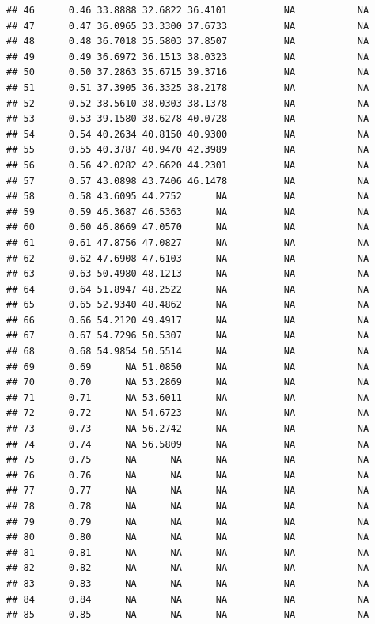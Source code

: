 \documentclass{article}\usepackage[]{graphicx}\usepackage[]{color}
\makeatletter
\newenvironment{kframe}{%
 \def\at@end@of@kframe{}%
 \ifinner\ifhmode%
  \def\at@end@of@kframe{\end{minipage}}%
  \begin{minipage}{\columnwidth}%
 \fi\fi%
 \def\FrameCommand##1{\hskip\@totalleftmargin \hskip-\fboxsep
 \colorbox{shadecolor}{##1}\hskip-\fboxsep
     \hskip-\linewidth \hskip-\@totalleftmargin \hskip\columnwidth}%
 \MakeFramed {\advance\hsize-\width
   \@totalleftmargin\z@ \linewidth\hsize
   \@setminipage}}%
 {\par\unskip\endMakeFramed%
 \at@end@of@kframe}
\newenvironment{knitrout}{}{} %
\makeatother
\begin{document}
\begin{knitrout}
\begin{kframe}
\begin{verbatim}
## 46      0.46 33.8888 32.6822 36.4101          NA           NA
## 47      0.47 36.0965 33.3300 37.6733          NA           NA
## 48      0.48 36.7018 35.5803 37.8507          NA           NA
## 49      0.49 36.6972 36.1513 38.0323          NA           NA
## 50      0.50 37.2863 35.6715 39.3716          NA           NA
## 51      0.51 37.3905 36.3325 38.2178          NA           NA
## 52      0.52 38.5610 38.0303 38.1378          NA           NA
## 53      0.53 39.1580 38.6278 40.0728          NA           NA
## 54      0.54 40.2634 40.8150 40.9300          NA           NA
## 55      0.55 40.3787 40.9470 42.3989          NA           NA
## 56      0.56 42.0282 42.6620 44.2301          NA           NA
## 57      0.57 43.0898 43.7406 46.1478          NA           NA
## 58      0.58 43.6095 44.2752      NA          NA           NA
## 59      0.59 46.3687 46.5363      NA          NA           NA
## 60      0.60 46.8669 47.0570      NA          NA           NA
## 61      0.61 47.8756 47.0827      NA          NA           NA
## 62      0.62 47.6908 47.6103      NA          NA           NA
## 63      0.63 50.4980 48.1213      NA          NA           NA
## 64      0.64 51.8947 48.2522      NA          NA           NA
## 65      0.65 52.9340 48.4862      NA          NA           NA
## 66      0.66 54.2120 49.4917      NA          NA           NA
## 67      0.67 54.7296 50.5307      NA          NA           NA
## 68      0.68 54.9854 50.5514      NA          NA           NA
## 69      0.69      NA 51.0850      NA          NA           NA
## 70      0.70      NA 53.2869      NA          NA           NA
## 71      0.71      NA 53.6011      NA          NA           NA
## 72      0.72      NA 54.6723      NA          NA           NA
## 73      0.73      NA 56.2742      NA          NA           NA
## 74      0.74      NA 56.5809      NA          NA           NA
## 75      0.75      NA      NA      NA          NA           NA
## 76      0.76      NA      NA      NA          NA           NA
## 77      0.77      NA      NA      NA          NA           NA
## 78      0.78      NA      NA      NA          NA           NA
## 79      0.79      NA      NA      NA          NA           NA
## 80      0.80      NA      NA      NA          NA           NA
## 81      0.81      NA      NA      NA          NA           NA
## 82      0.82      NA      NA      NA          NA           NA
## 83      0.83      NA      NA      NA          NA           NA
## 84      0.84      NA      NA      NA          NA           NA
## 85      0.85      NA      NA      NA          NA           NA

\end{verbatim}
\end{kframe}
\end{knitrout}
\end{document}
